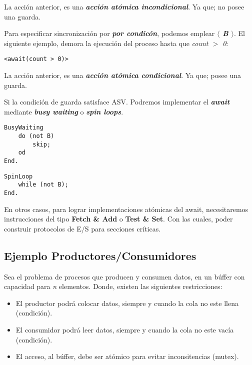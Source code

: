 \documentclass[a4paper, 10pt]{report}
\begin{document}
La acción anterior, es una \textbf{\emph{acción atómica incondicional}}. Ya que; no posee una guarda.

Para especificar sincronización por \textbf{\emph{por condicón}}, podemos emplear \textbf{\emph{$\langle$ B $\rangle$}}. El siguiente ejemplo, demora la ejecución del proceso hasta que \emph{count $>$ 0}:

\begin{lstlisting}
<await(count > 0)>
\end{lstlisting}
    

La acción anterior, es una \textbf{\emph{acción atómica condicional}}. Ya que; posee una guarda.

Si la condición de guarda satisface ASV. Podremos implementar el \textbf{\emph{await}} mediante \textbf{\emph{busy waiting}} o \textbf{\emph{spin loops}}.

\begin{multicols}{2}
\begin{lstlisting}
BusyWaiting
    do (not B)
        skip;
    od
End.
\end{lstlisting}
\columnbreak
\begin{lstlisting}
SpinLoop
    while (not B);
End.
\end{lstlisting}
\end{multicols}

En otros casos, para lograr implementaciones atómicas del await, necesitaremos instrucciones del tipo \textbf{Fetch \& Add} o \textbf{Test \& Set}. Con las cuales, poder construir protocolos de E/S para secciones críticas.

\subsection{Ejemplo Productores/Consumidores}

Sea el problema de procesos que producen y consumen datos, en un búffer con capacidad para \emph{n} elementos. Donde, existen las siguientes restricciones:

\begin{itemize}
    \item El productor podrá colocar datos, siempre y cuando la cola no este llena (condición).
    \item El consumidor podrá leer datos, siempre y cuando la cola no este vacía (condición).
    \item El acceso, al búffer, debe ser atómico para evitar inconsitencias (mutex).
\end{itemize}
\end{document}
